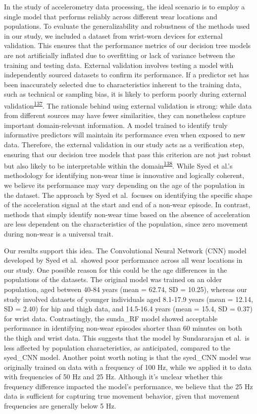 \documentclass[
  10pt,
]{scrbook}
\begin{document}
In the study of accelerometry data processing, the ideal scenario is to
employ a single model that performs reliably across different wear
locations and populations. To evaluate the generalizability and
robustness of the methods used in our study, we included a dataset from
wrist-worn devices for external validation. This ensures that the
performance metrics of our decision tree models are not artificially
inflated due to overfitting or lack of variance between the training and
testing data. External validation involves testing a model with
independently sourced datasets to confirm its performance. If a
predictor set has been inaccurately selected due to characteristics
inherent to the training data, such as technical or sampling bias, it is
likely to perform poorly during external
validation\textsuperscript{\protect\hyperlink{ref-steyerberg_prediction_2016}{137}}.
The rationale behind using external validation is strong: while data
from different sources may have fewer similarities, they can nonetheless
capture important domain-relevant information. A model trained to
identify truly informative predictors will maintain its performance even
when exposed to new data. Therefore, the external validation in our
study acts as a verification step, ensuring that our decision tree
models that pass this criterion are not just robust but also likely to
be interpretable within the
domain\textsuperscript{\protect\hyperlink{ref-altman_prognosis_2009}{138}}.
While Syed et al.'s methodology for identifying non-wear time is
innovative and logically coherent, we believe its performance may vary
depending on the age of the population in the dataset. The approach by
Syed et al.~focuses on identifying the specific shape of the
acceleration signal at the start and end of a non-wear episode. In
contrast, methods that simply identify non-wear time based on the
absence of acceleration are less dependent on the characteristics of the
population, since zero movement during non-wear is a universal trait.

Our results support this idea. The Convolutional Neural Network (CNN)
model developed by Syed et al.~showed poor performance across all wear
locations in our study. One possible reason for this could be the age
differences in the populations of the datasets. The original model was
trained on an older population, aged between 40-84 years (mean = 62.74,
SD = 10.25), whereas our study involved datasets of younger individuals
aged 8.1-17.9 years (mean = 12.14, SD = 2.40) for hip and thigh data,
and 14.5-16.4 years (mean = 15.4, SD = 0.37) for wrist data.
Contrastingly, the sunda\_RF model showed acceptable performance in
identifying non-wear episodes shorter than 60 minutes on both the thigh
and wrist data. This suggests that the model by Sundararajan et al.~is
less affected by population characteristics, as anticipated, compared to
the syed\_CNN model. Another point worth noting is that the syed\_CNN
model was originally trained on data with a frequency of 100 Hz, while
we applied it to data with frequencies of 50 Hz and 25 Hz. Although it's
unclear whether this frequency difference impacted the model's
performance, we believe that the 25 Hz data is sufficient for capturing
true movement behavior, given that movement frequencies are generally
below 5 Hz.
\end{document}
